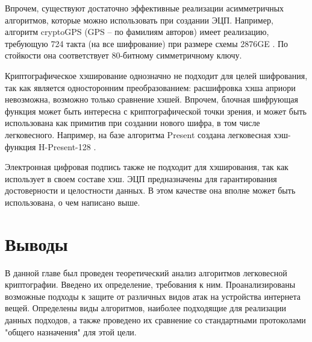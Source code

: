 Впрочем, существуют достаточно эффективные реализации асимметричных алгоритмов, которые можно использовать при создании ЭЦП. Например, алгоритм cryptoGPS (GPS – по фамилиям авторов) имеет реализацию, требующую 724 такта (на все шифрование) при размере схемы 2876GE \cite{src51}. По стойкости она соответствует 80-битному симметричному ключу.

Криптографическое хэширование однозначно не подходит для целей шифрования, так как является односторонним преобразованием: расшифровка хэша априори невозможна, возможно только сравнение хэшей. Впрочем, блочная шифрующая функция может быть интересна с криптографической точки зрения, и может быть использована как примитив при создании нового шифра, в том числе легковесного. Например, на базе алгоритма Present создана легковесная хэш-функция H-Present-128 \cite{src52}.

Электронная цифровая подпись также не подходит для хэширования, так как использует в своем составе хэш. ЭЦП предназначены для гарантирования достоверности и целостности данных. В этом качестве она вполне может быть использована, о чем написано выше.

\section{Выводы} \label{ch2:conclusion}

В данной главе был проведен теоретический анализ алгоритмов легковесной криптографии. Введено их определение, требования к ним. Проанализированы возможные подходы к защите от различных видов атак на устройства интернета вещей. Определены виды алгоритмов, наиболее подходящие для реализации данных подходов, а также проведено их сравнение со стандартными протоколами "общего назначения" для этой цели.

\newpage

%
